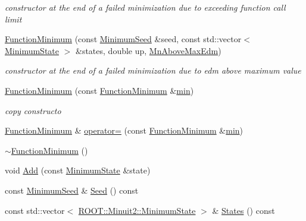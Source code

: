\begin{DoxyCompactItemize}
\begin{DoxyCompactList}\small\item\em constructor at the end of a failed minimization due to exceeding function call limit \end{DoxyCompactList}\item 
\mbox{\hyperlink{classROOT_1_1Minuit2_1_1FunctionMinimum_a70961c8a405bd4298247c9b353804154}{Function\+Minimum}} (const \mbox{\hyperlink{classROOT_1_1Minuit2_1_1MinimumSeed}{Minimum\+Seed}} \&seed, const std\+::vector$<$ \mbox{\hyperlink{classROOT_1_1Minuit2_1_1MinimumState}{Minimum\+State}} $>$ \&states, double up, \mbox{\hyperlink{classROOT_1_1Minuit2_1_1FunctionMinimum_1_1MnAboveMaxEdm}{Mn\+Above\+Max\+Edm}})
\begin{DoxyCompactList}\small\item\em constructor at the end of a failed minimization due to edm above maximum value \end{DoxyCompactList}\item 
\mbox{\hyperlink{classROOT_1_1Minuit2_1_1FunctionMinimum_a79c734eb76f50e7638255095bd0670aa}{Function\+Minimum}} (const \mbox{\hyperlink{classROOT_1_1Minuit2_1_1FunctionMinimum}{Function\+Minimum}} \&\mbox{\hyperlink{SU3__internal_8h_ab0f5fed3171eb00d1c5f037d9f518a23}{min}})
\begin{DoxyCompactList}\small\item\em copy constructo \end{DoxyCompactList}\item 
\mbox{\hyperlink{classROOT_1_1Minuit2_1_1FunctionMinimum}{Function\+Minimum}} \& \mbox{\hyperlink{classROOT_1_1Minuit2_1_1FunctionMinimum_a107909f1a994436795eb310f951f14cb}{operator=}} (const \mbox{\hyperlink{classROOT_1_1Minuit2_1_1FunctionMinimum}{Function\+Minimum}} \&\mbox{\hyperlink{SU3__internal_8h_ab0f5fed3171eb00d1c5f037d9f518a23}{min}})
\item 
\mbox{\hyperlink{classROOT_1_1Minuit2_1_1FunctionMinimum_aaaef452fc02a74a63a9390329ed1dd04}{$\sim$\+Function\+Minimum}} ()
\item 
void \mbox{\hyperlink{classROOT_1_1Minuit2_1_1FunctionMinimum_a13b69e2d431d568f4485eb8b79d6c781}{Add}} (const \mbox{\hyperlink{classROOT_1_1Minuit2_1_1MinimumState}{Minimum\+State}} \&state)
\item 
const \mbox{\hyperlink{classROOT_1_1Minuit2_1_1MinimumSeed}{Minimum\+Seed}} \& \mbox{\hyperlink{classROOT_1_1Minuit2_1_1FunctionMinimum_a9812689b192b202a73ce1178e8098705}{Seed}} () const
\item 
const std\+::vector$<$ \mbox{\hyperlink{classROOT_1_1Minuit2_1_1MinimumState}{R\+O\+O\+T\+::\+Minuit2\+::\+Minimum\+State}} $>$ \& \mbox{\hyperlink{classROOT_1_1Minuit2_1_1FunctionMinimum_a5f08def4f7ca92700393d42ded6eb237}{States}} () const

\end{DoxyCompactItemize}
